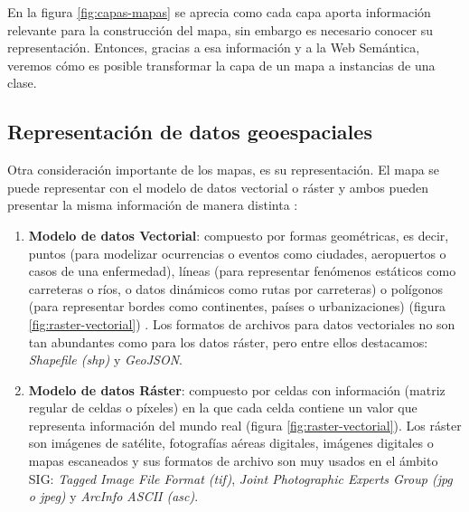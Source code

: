 En la figura \ref{fig:capas-mapas} se aprecia como cada capa aporta información relevante para la construcción del mapa, sin embargo es necesario conocer su representación. Entonces, gracias a esa información y a la Web Semántica, veremos cómo es posible transformar la capa de un mapa a instancias de una clase.

\subsection{Representación de datos geoespaciales}
\label{ch:capitulo2-representacion}


Otra consideración importante de los mapas, es su representación. El mapa se puede representar con el modelo de datos vectorial o ráster y ambos pueden presentar la misma información de manera distinta \cite{tipos-datos-sig}:

\begin{enumerate}
	\item \textbf{Modelo de datos Vectorial}: compuesto por formas geométricas, es decir, puntos (para modelizar ocurrencias o eventos como ciudades, aeropuertos o casos de una enfermedad), líneas (para representar fenómenos estáticos como carreteras o ríos, o datos dinámicos como rutas por carreteras) o polígonos (para representar bordes como continentes, países o urbanizaciones) (figura \ref{fig:raster-vectorial}) \cite{AsignaturaSIG}. Los formatos de archivos para datos vectoriales no son tan abundantes como para los datos ráster, pero entre ellos destacamos: \textit{Shapefile (shp)} y \textit{GeoJSON}.
	
	\item \textbf{Modelo de datos Ráster}: compuesto por celdas con información (matriz regular de celdas o píxeles) en la que cada celda contiene un valor que representa información del mundo real (figura \ref{fig:raster-vectorial}). Los ráster son imágenes de satélite, fotografías aéreas digitales, imágenes digitales o mapas escaneados \cite{raster} y sus formatos de archivo son muy usados en el ámbito SIG: \textit{Tagged Image File Format (tif)}, \textit{Joint Photographic Experts Group (jpg o jpeg)} y \textit{ArcInfo ASCII (asc)}.
	
	
	
\end{enumerate}



